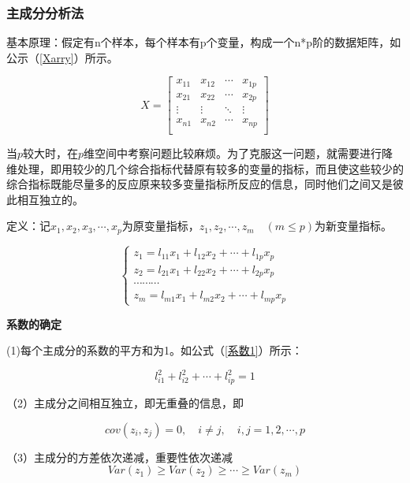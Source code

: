\documentclass[withoutpreface,bwprint]{cumcmthesis} %
\begin{document}
\subsubsection{主成分分析法}
\par 基本原理：假定有n个样本，每个样本有p个变量，构成一个n*p阶的数据矩阵，如公示（\ref{Xarry}）所示。

\begin{equation}
\label{Xarry}
X = \begin{bmatrix}
x_{11} & x_{12} & \cdots & x_{1p}\\
x_{21} & x_{22} & \cdots & x_{2p}\\
\vdots & \vdots & \ddots & \vdots \\
x_{n1} & x_{n2} & \cdots & x_{np}\\
\end{bmatrix}
\end{equation}


\par 当$p$较大时，在$p$维空间中考察问题比较麻烦。为了克服这一问题，就需要进行降维处理，即用较少的几个综合指标代替原有较多的变量的指标，而且使这些较少的综合指标既能尽量多的反应原来较多变量指标所反应的信息，同时他们之间又是彼此相互独立的。

\par 定义：记$x_1,x_2,x_3,\cdots,x_p$为原变量指标，$z_1,z_2,\cdots ,z_m \quad (m \leqslant p)$为新变量指标。

\begin{equation}
\label{zz}
\left\{
\begin{aligned}
z_1 = l_{11}x_1 + l_{12}x_2 + \cdots + l_{1p}x_p\\
z_2 = l_{21}x_1 + l_{22}x_2 + \cdots + l_{2p}x_p\\
\cdots \cdots \cdots \\
z_m = l_{m1}x_1 + l_{m2}x_2 + \cdots + l_{mp}x_p
\end{aligned}
\right.
\end{equation}

\textbf{系数的确定}
\par (1)每个主成分的系数的平方和为1。如公式（\ref{系数1}）所示：

\begin{equation}
\label{系数1}
	l_{i1}^{2} + l_{i2}^{2} + \cdots + l_{ip}^{2} = 1
\end{equation}

\par （2）主成分之间相互独立，即无重叠的信息，即

\begin{equation}
	cov(z_i,z_j) = 0, \quad i \neq j ,\quad i,j = 1,2,\cdots,p
\end{equation}
\par （3）主成分的方差依次递减，重要性依次递减
\begin{equation}
	Var(z_1) \geqslant Var(z_2) \geqslant \cdots \geqslant Var(z_m)   	
\end{equation}
\end{document}
